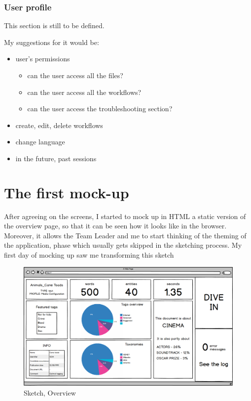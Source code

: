 \documentclass[12pt,oneside,svgnames]{memoir}
\begin{document}
\subsubsection*{User profile}\label{user-profile}

This section is still to be defined.

My suggestions for it would be:

\begin{itemize}
\itemsep1pt\parskip0pt
\item
  user's permissions

  \begin{itemize}
  \itemsep1pt\parskip0pt
  \item
    can the user access all the files?
  \item
    can the user access all the workflows?
  \item
    can the user access the troubleshooting section?
  \end{itemize}
\item
  create, edit, delete workflows
\item
  change language
\item
  in the future, past sessions
\end{itemize}

\section{The first mock-up}\label{the-first-mock-up}

After agreeing on the screens, I started to mock up in HTML a static
version of the overview page, so that it can be seen how it looks like
in the browser. Moreover, it allows the Team Leader and me to start
thinking of the theming of the application, phase which usually gets
skipped in the sketching process. My first day of mocking up saw me
transforming this sketch

\begin{figure}[htbp]
\centering
\includegraphics{./src/img/sketch-overview.png}
\caption{Sketch, Overview}
\end{figure}
\end{document}
